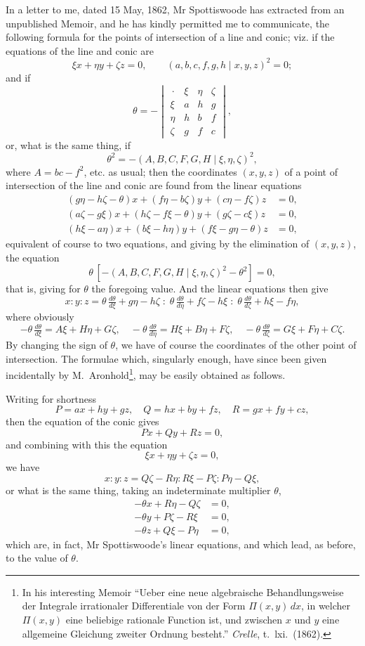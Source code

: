 \documentclass[11pt]{article}
\begin{document}
In a letter to me, dated 15 May, 1862, Mr Spottiswoode has extracted from an unpublished Memoir, and he has kindly permitted me to communicate, the following formula for the points of intersection of a line and conic; viz. if the equations of the line and conic are
\[ \xi x + \eta y + \zeta z = 0, \qquad (a,b,c,f,g,h \mid x,y,z)^2 = 0; \]
and if
\[ \theta = -\begin{vmatrix} \, \cdot \, & \xi & \eta & \zeta \\ \xi & a & h & g \\ \eta & h & b & f \\ \zeta & g & f & c \end{vmatrix}, \]
or, what is the same thing, if
\[ \theta^2 = -(A,B,C,F,G,H \mid \xi,\eta,\zeta)^2, \]
where $A = bc - f^2$, etc. as usual; then the coordinates $(x,y,z)$ of a point of intersection of the line and conic are found from the linear equations
\begin{align*}
(g\eta - h\zeta - \theta)x + (f\eta - b\zeta)y + (c\eta - f\zeta)z &= 0,\\
(a\zeta - g\xi)x + (h\zeta - f\xi - \theta)y + (g\zeta - c\xi)z &= 0,\\
(h\xi - a\eta)x + (b\xi - h\eta)y + (f\xi - g\eta - \theta)z &= 0,
\end{align*}
equivalent of course to two equations, and giving by the elimination of $(x,y,z)$, the equation
\[ \theta\,[-(A,B,C,F,G,H \mid \xi,\eta,\zeta)^2 - \theta^2] = 0, \]
that is, giving for $\theta$ the foregoing value. And the linear equations then give
\[ x : y : z = \theta\,\tfrac{d\theta}{d\xi}+g\eta-h\zeta \;:\; \theta\,\tfrac{d\theta}{d\eta}+f\zeta-h\xi \;:\; \theta\,\tfrac{d\theta}{d\zeta}+h\xi-f\eta, \]
where obviously
\[ -\theta\,\tfrac{d\theta}{d\xi} = A\xi + H\eta + G\zeta,\quad -\theta\,\tfrac{d\theta}{d\eta} = H\xi + B\eta + F\zeta,\quad -\theta\,\tfrac{d\theta}{d\zeta} = G\xi + F\eta + C\zeta. \]
By changing the sign of $\theta$, we have of course the coordinates of the other point of intersection. The formulae which, singularly enough, have since been given incidentally by M.~Aronhold\footnote{In his interesting Memoir ``Ueber eine neue algebraische Behandlungsweise der Integrale irrationaler Differentiale von der Form $\Pi(x,y)\,dx$, in welcher $\Pi(x,y)$ eine beliebige rationale Function ist, und zwischen $x$ und $y$ eine allgemeine Gleichung zweiter Ordnung besteht.'' \emph{Crelle}, t.~lxi.~(1862).}, may be easily obtained as follows.

Writing for shortness
\[ P = ax + hy + gz,\quad Q = hx + by + fz,\quad R = gx + fy + cz, \]
then the equation of the conic gives
\[ Px + Qy + Rz = 0, \]
and combining with this the equation
\[ \xi x + \eta y + \zeta z = 0, \]
we have
\[ x : y : z = Q\zeta - R\eta : R\xi - P\zeta : P\eta - Q\xi, \]
or what is the same thing, taking an indeterminate multiplier $\theta$,
\begin{align*}
-\theta x + R\eta - Q\zeta &= 0,\\
-\theta y + P\zeta - R\xi &= 0,\\
-\theta z + Q\xi - P\eta &= 0,
\end{align*}
which are, in fact, Mr Spottiswoode's linear equations, and which lead, as before, to the value of $\theta$.
\end{document}
